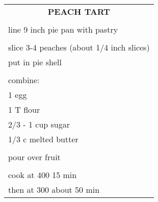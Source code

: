 \documentclass[8pt]{report}
\begin{document}
\begin{tabular}{|l|} \hline	%
 
\multicolumn{1}{|c|}{\textbf{PEACH TART}}
\\
\\

\index{desserts!peach tart} \index{peach tart} \index{tart!peach}

line 9 inch pie pan with pastry\\
\\
slice 3-4 peaches (about 1/4 inch slices)\\
put in pie shell\\
\\
combine:\\
\hspace{0.5 in}	1 egg\\
\hspace{0.5 in}	1 T flour\\
\hspace{0.5 in}	2/3 - 1 cup sugar\\
\hspace{0.5 in}	1/3 c melted butter\\
\\
pour over fruit\\
\\
cook at 400 15 min\\
then at 300 about 50 min\\
\hline

\end{tabular}

\newpage

\centering
\end{document}
